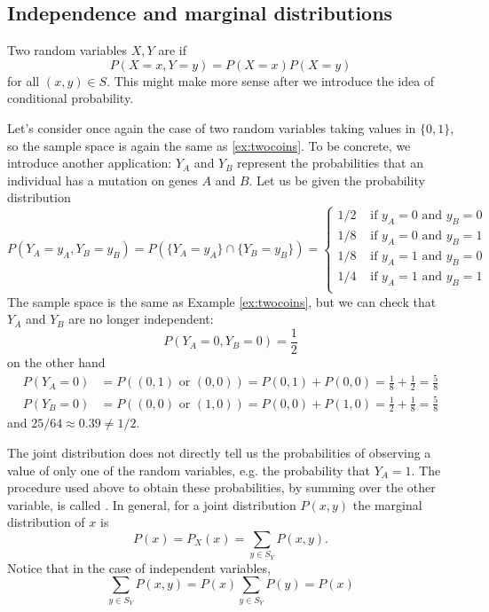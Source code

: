 \subsection{Independence and marginal distributions}
Two random variables $X,Y$ are  if 
\begin{equation}
P(X=x,Y=y) = P(X=x)P(X=y)
\end{equation}
for all $(x,y) \in S$. This might make more sense after we introduce the idea of conditional probability. 

\begin{example}\label{ex:mut} Let's consider once again the case of two random variables taking values in $\{0,1\}$, so the sample space is again the same as \ref{ex:twocoins}.  To be concrete, we introduce another application: $Y_A$ and $Y_B$ represent the probabilities that an individual has a mutation on genes $A$ and $B$. Let us be given the probability distribution 
\begin{equation*}\label{eq:gene}
P(Y_A = y_A,Y_B=y_B)  = P(\{Y_A = y_A \}\cap \{Y_B=y_B\}) = \left\{ \begin{array}{cc}
1/2 & \text{ if }y_A=0 \text{ and } y_B = 0\\
1/8 & \text{ if }y_A=0 \text{ and } y_B = 1\\
1/8 & \text{ if }y_A=1 \text{ and } y_B = 0\\
1/4 & \text{ if }y_A=1 \text{ and } y_B = 1\\
\end{array}
 \right.
\end{equation*}
The sample space is the same as Example \ref{ex:twocoins}, but we can check that $Y_A$ and $Y_B$ are no longer independent:
\begin{equation*}
P(Y_A=0,Y_B=0) =  \frac{1}{2}
\end{equation*}
on the other hand 
\begin{align*}
P(Y_A=0) &= P((0,1) \text{ or }(0,0)) = P(0,1) + P(0,0) = \frac{1}{8} + \frac{1}{2} =\frac{5}{8} \\
P(Y_B=0) &= P((0,0) \text{ or }(1,0)) = P(0,0) + P(1,0) = \frac{1}{2} + \frac{1}{8}= \frac{5}{8}
\end{align*}
and $25/64  \approx  0.39 \ne 1/2$. 

\end{example}


 The joint distribution does not directly tell us the probabilities of observing a value of only one of the random variables, e.g. the probability that $Y_A = 1$. The procedure used above to obtain these probabilities, by summing over the other variable, is called . In general, for a joint distribution $P(x,y)$ the marginal distribution of $x$ is 
 \begin{equation}
 P(x) = P_X(x) = \sum_{y \in S_Y}P(x,y). 
 \end{equation}
 Notice that in the case of independent variables, 
  \begin{equation}
 \sum_{y \in S_Y}P(x,y) = P(x) \sum_{y \in S_Y}P(y) = P(x)
 \end{equation}
 
